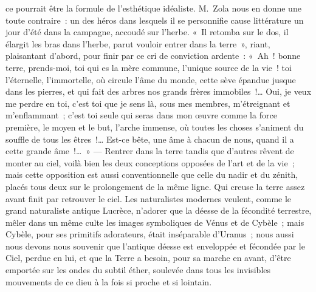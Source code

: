 \documentclass[french,twoside]{book} %
\begin{document}
\noindent ce pourrait être la formule de l’esthétique idéaliste. M. Zola nous en donne une toute contraire : un des héros dans lesquels il se personnifie cause littérature un jour d’été dans la campagne, accoudé sur l’herbe. « Il retomba sur le dos, il élargit les bras dans l’herbe, parut vouloir entrer dans la terre », riant, plaisantant d’abord, pour finir par ce cri de conviction ardente : « Ah ! bonne terre, prends-moi, toi qui es la mère commune, l’unique source de la vie ! toi l’éternelle, l’immortelle, où circule l’âme du monde, cette sève épandue jusque dans les pierres, et qui fait des arbres nos grands frères immobiles !… Oui, je veux me perdre en toi, c’est toi que je sens là, sous mes membres, m’étreignant et m’enflammant ; c’est toi seule qui seras dans mon œuvre comme la force première, le moyen et le but, l’arche immense, où toutes les choses s’animent du souffle de tous les êtres !… Est-ce bête, une âme à chacun de nous, quand il a cette grande âme !… » — Rentrer dans la terre tandis que d’autres rêvent de monter au ciel, voilà bien les deux conceptions opposées de l’art et de la vie ; mais cette opposition est aussi conventionnelle que celle du nadir et du zénith, placés tous deux sur le prolongement de la même ligne. Qui creuse la terre assez avant finit par retrouver le ciel. Les naturalistes modernes veulent, comme le grand naturaliste antique Lucrèce, n’adorer que la déesse de la fécondité terrestre, mêler dans un même culte les images symboliques de Vénus et de Cybèle ; mais Cybèle, pour ses primitifs adorateurs, était inséparable d’Uranus ; nous aussi nous devons nous souvenir que l’antique déesse est enveloppée et fécondée par le Ciel, perdue en lui, et que la Terre a besoin, pour sa marche en avant, d’être emportée sur les ondes du subtil éther, soulevée dans tous les invisibles mouvements de ce dieu à la fois si proche et si lointain.\par
\end{document}
